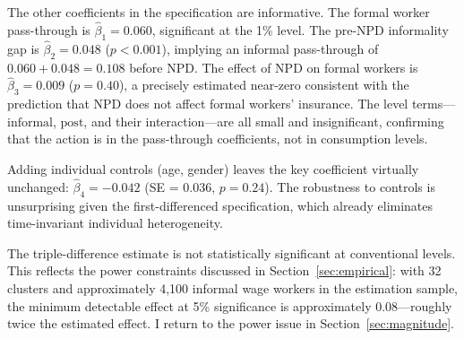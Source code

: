 \documentclass[12pt]{article}
\begin{document}
The other coefficients in the specification are informative. The formal worker pass-through is $\hat{\beta}_1 = 0.060$, significant at the 1\% level. The pre-NPD informality gap is $\hat{\beta}_2 = 0.048$ ($p < 0.001$), implying an informal pass-through of $0.060 + 0.048 = 0.108$ before NPD. The effect of NPD on formal workers is $\hat{\beta}_3 = 0.009$ ($p = 0.40$), a precisely estimated near-zero consistent with the prediction that NPD does not affect formal workers' insurance. The level terms---$\text{informal}$, $\text{post}$, and their interaction---are all small and insignificant, confirming that the action is in the pass-through coefficients, not in consumption levels.

Adding individual controls (age, gender) leaves the key coefficient virtually unchanged: $\hat{\beta}_4 = -0.042$ (SE = 0.036, $p = 0.24$). The robustness to controls is unsurprising given the first-differenced specification, which already eliminates time-invariant individual heterogeneity.

The triple-difference estimate is not statistically significant at conventional levels. This reflects the power constraints discussed in Section~\ref{sec:empirical}: with 32 clusters and approximately 4,100 informal wage workers in the estimation sample, the minimum detectable effect at 5\% significance is approximately 0.08---roughly twice the estimated effect. I return to the power issue in Section~\ref{sec:magnitude}.
\end{document}
